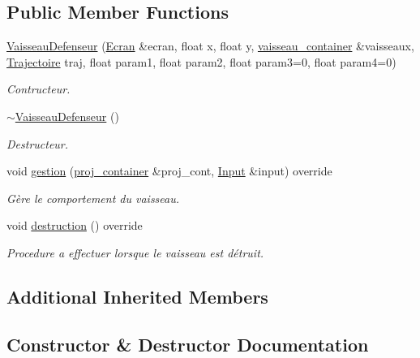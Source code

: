 \subsection*{Public Member Functions}
\begin{DoxyCompactItemize}
\item 
\mbox{\hyperlink{class_vaisseau_defenseur_a19c543d8b04bdc0bb1d1c349bd3f1b99}{Vaisseau\+Defenseur}} (\mbox{\hyperlink{class_ecran}{Ecran}} \&ecran, float x, float y, \mbox{\hyperlink{def__type_8h_ad123ed7c93f42c8dd68e4af28b16b639}{vaisseau\+\_\+container}} \&vaisseaux, \mbox{\hyperlink{_trajectoire_8h_afa7f6e8323d7ee755d93cd1f6019dd95}{Trajectoire}} traj, float param1, float param2, float param3=0, float param4=0)
\begin{DoxyCompactList}\small\item\em Contructeur. \end{DoxyCompactList}\item 
\mbox{\hyperlink{class_vaisseau_defenseur_afb1098f176694c537f9a6c31da42d165}{$\sim$\+Vaisseau\+Defenseur}} ()
\begin{DoxyCompactList}\small\item\em Destructeur. \end{DoxyCompactList}\item 
void \mbox{\hyperlink{class_vaisseau_defenseur_a9d8301faaaebc09dd5e807e8ebe829ae}{gestion}} (\mbox{\hyperlink{def__type_8h_a87980cd8ee9533e561a73e8bbc728188}{proj\+\_\+container}} \&proj\+\_\+cont, \mbox{\hyperlink{_input_8h_a5588d60d674991c719a8df848313e966}{Input}} \&input) override
\begin{DoxyCompactList}\small\item\em Gère le comportement du vaisseau. \end{DoxyCompactList}\item 
void \mbox{\hyperlink{class_vaisseau_defenseur_aeaaaa161533c6aa07b627172d8657b3a}{destruction}} () override
\begin{DoxyCompactList}\small\item\em Procedure a effectuer lorsque le vaisseau est détruit. \end{DoxyCompactList}\end{DoxyCompactItemize}
\subsection*{Additional Inherited Members}


\subsection{Constructor \& Destructor Documentation}
\mbox{\label{class_vaisseau_defenseur_a19c543d8b04bdc0bb1d1c349bd3f1b99}} 
